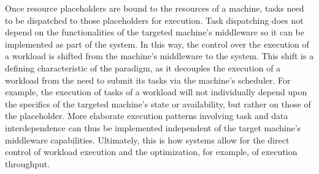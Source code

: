 \documentclass{sig-alternate}
\begin{document}

Once resource placeholders are bound to the resources of a machine, tasks need
to be dispatched to those placeholders for execution. Task dispatching does not
depend on the functionalities of the targeted machine's middleware so it can be
implemented as part of the \pilotjob system. In this way, the control over the
execution of a workload is shifted from the machine's middleware to the \pilot
system. This shift is a defining characteristic of the \pilot paradigm, as it
decouples the execution of a workload from the need to submit its tasks via the
machine's scheduler.  For example, the execution of tasks of a workload will not
individually depend upon the specifics of the targeted machine's state or
availability, but rather on those of the placeholder. More elaborate execution
patterns involving task and data interdependence can thus be implemented
independent of the target machine's middleware capabilities. Ultimately, this is
how \pilotjob systems allow for the direct control of workload execution and the
optimization, for example, of execution throughput.



\end{document}
